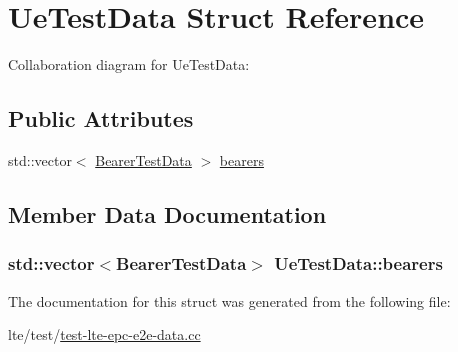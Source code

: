 \hypertarget{structUeTestData}{}\section{Ue\+Test\+Data Struct Reference}
\label{structUeTestData}


Collaboration diagram for Ue\+Test\+Data\+:
\subsection*{Public Attributes}
\begin{DoxyCompactItemize}
\item 
std\+::vector$<$ \hyperlink{structBearerTestData}{Bearer\+Test\+Data} $>$ \hyperlink{structUeTestData_ab02618dc9dfd673f397c313dae3df481}{bearers}
\end{DoxyCompactItemize}


\subsection{Member Data Documentation}
\subsubsection[{\texorpdfstring{bearers}{bearers}}]{\setlength{\rightskip}{0pt plus 5cm}std\+::vector$<${\bf Bearer\+Test\+Data}$>$ Ue\+Test\+Data\+::bearers}\hypertarget{structUeTestData_ab02618dc9dfd673f397c313dae3df481}{}\label{structUeTestData_ab02618dc9dfd673f397c313dae3df481}


The documentation for this struct was generated from the following file\+:\begin{DoxyCompactItemize}
\item 
lte/test/\hyperlink{test-lte-epc-e2e-data_8cc}{test-\/lte-\/epc-\/e2e-\/data.\+cc}\end{DoxyCompactItemize}
